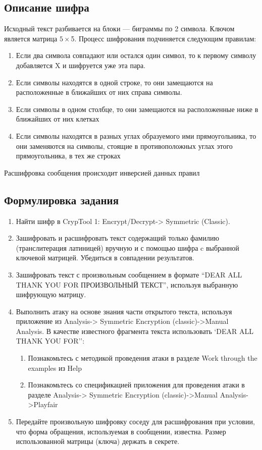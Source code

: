 \documentclass[a4paper, 14pt]{extarticle}
\begin{document}
\subsection{Описание шифра}
Исходный текст разбивается на блоки --- биграммы по 2 символа. Ключом является матрица $5\times$5.
Процесс шифрования подчиняется следующим правилам:
\begin{enumerate}
    \item Если два символа совпадают или остался один символ, то к первому символу добавляется X и шифруется уже эта пара.
    \item Если символы находятся в одной строке, то они замещаются на расположенные в ближайших от них справа символы.
    \item Если символы в одном столбце, то они замещаются на расположенные ниже в ближайших от них клетках
    \item Если символы находятся в разных углах образуемого ими прямоугольника, то они заменяются на символы, стоящие в противоположных углах этого прямоугольника, в тех же строках\\
\end{enumerate}

Расшифровка сообщения происходит инверсией данных правил

\subsection{Формулировка задания}
\begin{enumerate}
    \item Найти шифр в CrypTool 1: Encrypt/Decrypt-> Symmetric (Classic).
    \item Зашифровать и расшифровать текст содержащий только фамилию (транслитерация латиницей) вручную и с помощью шифра c выбранной ключевой матрицей. Убедиться в совпадении результатов.
    \item Зашифровать текст с произвольным сообщением в формате ``DEAR ALL THANK YOU FOR ПРОИЗВОЛЬНЫЙ ТЕКСТ'', используя выбранную шифрующую матрицу.
    \item Выполнить атаку на основе знания части открытого текста, используя приложение из Analysis-> Symmetric Encryption (classic)->Manual Analysis. В качестве известного фрагмента текста использовать `DEAR ALL THANK YOU FOR'':
    \begin{enumerate}  
        \item Познакомьтесь с методикой проведения атаки в разделе Work through the examples из Help
        \item Познакомьтесь со спецификацией приложения для проведения атаки в разделе Analysis-> Symmetric Encryption (classic)->Manual Analysis->Playfair
    \end{enumerate}
    \item Передайте произвольную шифровку соседу для расшифрования
при условии, что форма обращения, используемая в сообщении, известна.
Размер использованной матрицы (ключа) держать в секрете.
\end{enumerate}
\end{document}
